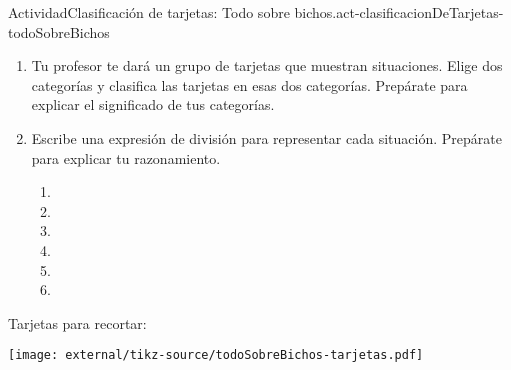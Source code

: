 \documentclass[14pt]{extarticle}
\begin{document}
\begin{activity}{Actividad}{Clasificación de tarjetas: Todo sobre bichos.}{act-clasificacionDeTarjetas-todoSobreBichos}%
%
\begin{enumerate}
\item{}Tu profesor te dará un grupo de tarjetas que muestran situaciones. Elige dos categorías y clasifica las tarjetas en esas dos categorías. Prepárate para explicar el significado de tus categorías.%
\item{}Escribe una expresión de división para representar cada situación. Prepárate para explicar tu razonamiento.%
%
\begin{enumerate}[label={\Alph*.}]
\item{}\vspace{0.5cm}%
\item{}\vspace{1cm}%
\item{}\vspace{1cm}%
\item{}\vspace{1cm}%
\item{}\vspace{1cm}%
\item{}\vspace{1cm}%
\end{enumerate}
\end{enumerate}
\clearpage
Tarjetas para recortar:%
\begin{image}{0}{1}{0}{}%
\texttt{[image: external/tikz-source/todoSobreBichos-tarjetas.pdf]}
\end{image}%
\end{activity}
\end{document}
